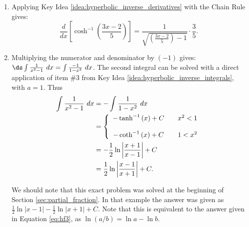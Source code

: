 {\begin{enumerate}
\item		Applying Key Idea \ref{idea:hyperbolic_inverse_derivatives} with the Chain Rule gives:
		$$\frac{d}{dx}\left[\cosh^{-1}\left(\frac{3x-2}5\right)\right] = \frac{1}{\sqrt{\left(\frac{3x-2}5\right)-1}}\cdot\frac35.$$

\item		Multiplying the numerator and denominator by $(-1)$ gives: $\ds \int \frac{1}{x^2-1}\ dx = \int \frac{-1}{1-x^2}\ dx$. The second integral can be solved with a direct application of item \#3 from Key Idea \ref{idea:hyperbolic_inverse_integrals}, with $a=1$. Thus
\begin{align}
\int \frac{1}{x^2-1}\ dx &= -\int \frac{1}{1-x^2}\ dx \notag \\
		&= \left\{\begin{array}{ccc} -\tanh^{-1}\left(x\right)+C & & x^2<1 \\ \\
-\coth^{-1}\left(x\right)+C & & 1<x^2 \end{array}\right. \notag\\
     &=-\frac12\ln\left|\frac{x+1}{x-1}\right|+C\notag\\
     &=\frac12\ln\left|\frac{x-1}{x+1}\right|+C.\label{eq:hf3}
     \end{align}

We should note that this exact problem was solved at the beginning of Section \ref{sec:partial_fraction}. In that example the answer was given as $\frac12\ln|x-1|-\frac12\ln|x+1|+C.$ Note that this is equivalent to the answer given in Equation \ref{eq:hf3}, as $\ln(a/b) = \ln a - \ln b$.

%


\end{enumerate}}
